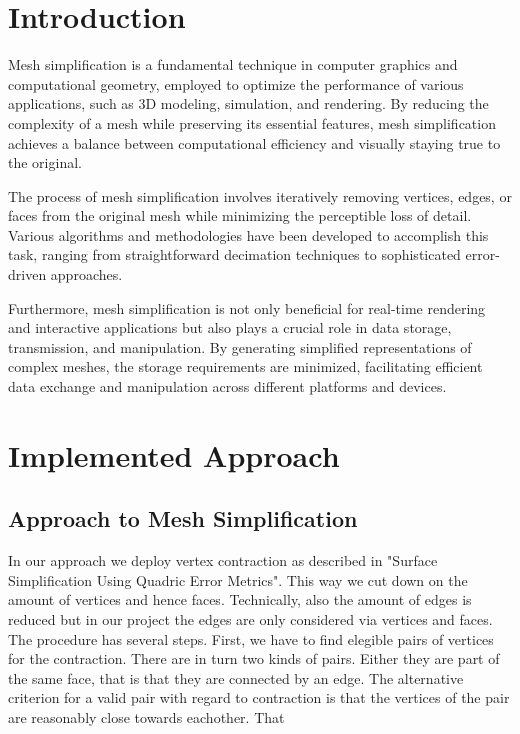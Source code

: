 \documentclass{article}
\author[]{Felix Widmaier}
\author[]{Robin Mark Riegraf}
\author[]{Yangshan Xiang}
\author[]{Minming Zhao}
\affil[]{Georg-August-Universität Göttingen}
\begin{document}
%
%
\newpage
%
%
\section{Introduction}
Mesh simplification is a fundamental technique in computer graphics and computational geometry, employed to optimize the performance of various applications, such as 3D modeling, simulation, and rendering. By reducing the complexity of a mesh while preserving its essential features, mesh simplification achieves a balance between computational efficiency and visually staying true to the original.

The process of mesh simplification involves iteratively removing vertices, edges, or faces from the original mesh while minimizing the perceptible loss of detail. Various algorithms and methodologies have been developed to accomplish this task, ranging from straightforward decimation techniques to sophisticated error-driven approaches.

Furthermore, mesh simplification is not only beneficial for real-time rendering and interactive applications but also plays a crucial role in data storage, transmission, and manipulation. By generating simplified representations of complex meshes, the storage requirements are minimized, facilitating efficient data exchange and manipulation across different platforms and devices.

\section{Implemented Approach}
\subsection{Approach to Mesh Simplification}
In our approach we deploy vertex contraction as described in "Surface Simplification Using Quadric Error Metrics". This way we cut down on the amount of vertices and hence faces. Technically, also the amount of edges is reduced but in our project the edges are only considered via vertices and faces.\\
The procedure has several steps. First, we have to find elegible pairs of vertices for the contraction. There are in turn two kinds of pairs. Either they are part of the same face, that is that they are connected by an edge. The alternative criterion for a valid pair with regard to contraction is that the vertices of the pair are reasonably close towards eachother. That 
\end{document}
